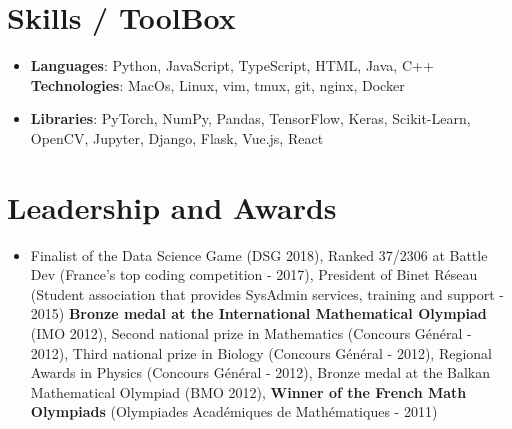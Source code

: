 \documentclass[letterpaper,10pt]{article}
\newcommand{\resumeSubHeadingListStart}{\begin{itemize}[leftmargin=*]}
\newcommand{\resumeSubHeadingListEnd}{\end{itemize}}
\newcommand{\shorterSection}[1]{\vspace{-10pt}\section{#1}}
\begin{document}
\shorterSection{Skills / ToolBox}
  \resumeSubHeadingListStart
  \small
    \item{
     \textbf{Languages}{: Python, JavaScript, TypeScript, HTML, Java, C++}
     \hfill
     \textbf{Technologies}{: MacOs, Linux, vim, tmux, git, nginx, Docker}
    }
    \vspace{-5pt}
    \item{
     \textbf{Libraries}{: PyTorch, NumPy, Pandas, TensorFlow, Keras, Scikit-Learn, OpenCV, Jupyter, Django, Flask, Vue.js, React}
    }
\resumeSubHeadingListEnd

\shorterSection{Leadership and Awards}
  \resumeSubHeadingListStart
    \item[]\small{
        {Finalist of the Data Science Game (DSG 2018), Ranked 37/2306 at Battle Dev (France's top coding competition - 2017), President of Binet Réseau (Student association that provides SysAdmin services, training and support - 2015) \textbf{Bronze medal at the International Mathematical Olympiad} (IMO 2012), Second national prize in Mathematics (Concours Général - 2012),  Third national prize in Biology (Concours Général - 2012),  Regional Awards in Physics (Concours Général - 2012), Bronze medal at the Balkan Mathematical Olympiad (BMO 2012), \textbf{Winner of the French Math Olympiads} (Olympiades Académiques de Mathématiques - 2011)  \vspace{-6pt}}
    }
  \resumeSubHeadingListEnd
\end{document}

